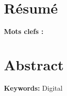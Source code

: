 
\section*{Résumé }



{\bf Mots clefs : } 

\section*{Abstract}



{\bf Keywords:} Digital 
  




 
